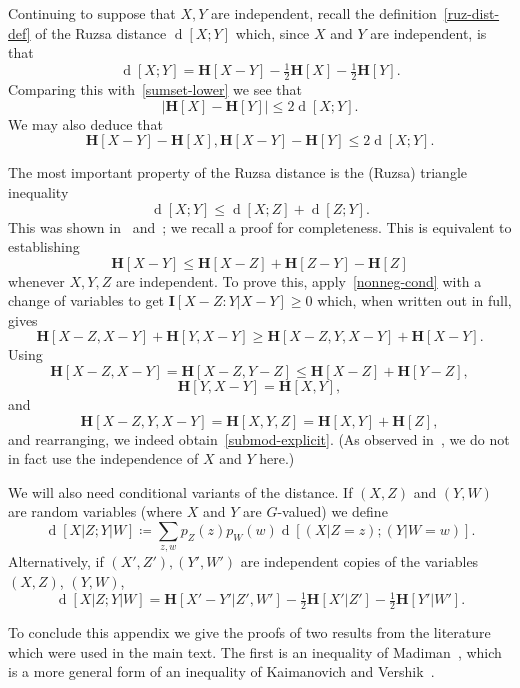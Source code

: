 \documentclass[12pt,reqno,tbtags]{amsart}
\theoremstyle{definition}
\theoremstyle{remark}
\renewcommand{\leq}{\leqslant}
\renewcommand{\geq}{\geqslant}
\newcommand{\ent}[1]{\mathbf{H}[#1]}
\newcommand{\I}[1]{\mathbf{I}[#1]}
\newcommand{\dist}[2]{{\operatorname{d}[#1;#2]}} %
\numberwithin{equation}{section}
\begin{document}
Continuing to suppose that $X, Y$ are independent, recall the definition~\eqref{ruz-dist-def} of the Ruzsa distance $\dist{X}{Y}$ which, since $X$ and $Y$ are independent, is that
\[
  \dist{X}{Y} = \ent{X - Y} - \tfrac{1}{2} \ent{X} - \tfrac{1}{2} \ent{Y}.
\]
Comparing this with~\eqref{sumset-lower} we see that
\begin{equation}
  \label{ruzsa-diff}
  |\ent{X}-\ent{Y}| \leq 2\dist{X}{Y}.
\end{equation}
We may also deduce that
\[
  \ent{X-Y} - \ent{X}, \ent{X-Y} - \ent{Y} \leq 2\dist{X}{Y}.
\]

The most important property of the Ruzsa distance is the (Ruzsa) triangle inequality
\[ \dist{X}{Y} \leq \dist{X}{Z} + \dist{Z}{Y}.\]
This was shown in~\cite{ruzsa-entropy} and~\cite[(16)]{tao-entropy}; we recall a proof for completeness.
This is equivalent to establishing
\begin{equation}\label{submod-explicit} \ent{X - Y} \leq \ent{X-Z} + \ent{Z-Y} - \ent{Z}\end{equation}
whenever $X, Y, Z$ are independent. To prove this, apply~\eqref{nonneg-cond} with a change of variables to get $\I{X-Z : Y | X - Y} \geq 0$ which, when written out in full, gives
\[ \ent{X - Z, X - Y} + \ent{Y, X - Y} \geq \ent{X - Z, Y, X - Y} + \ent{X - Y}.\]
Using
\[ \ent{X - Z, X - Y} = \ent{X-Z, Y-Z}  \leq \ent{X - Z} + \ent{Y - Z},\]
\[ \ent{Y, X - Y} = \ent{X, Y}, \] and
\[ \ent{X - Z, Y, X - Y} = \ent{X, Y, Z} = \ent{X, Y} + \ent{Z},\] and rearranging, we indeed obtain~\eqref{submod-explicit}. (As observed in~\cite{gmt}, we do not in fact use the independence of $X$ and $Y$ here.)


We will also need conditional variants of the distance.
If $(X, Z)$ and $(Y, W)$ are random variables (where $X$ and $Y$ are $G$-valued) we define
\begin{equation} \dist{X  | Z}{Y | W}   \coloneqq \sum_{z,w} p_{Z}(z) p_{W}(w) \dist{(X| Z=z)}{(Y| W = w )}.\label{cond-dist-def}
\end{equation}
Alternatively, if $(X',Z'), (Y',W')$ are independent copies of the variables $(X,Z)$, $(Y,W)$,
\begin{equation}\label{cond-dist-alt} \dist{X  | Z}{Y | W} = \ent{X'-Y'|Z',W'} - \tfrac{1}{2} \ent{X'|Z'} - \tfrac{1}{2}\ent{Y'|W'} .\end{equation}

To conclude this appendix we give the proofs of two results from the literature which were used in the main text.  The first is an inequality of Madiman~\cite[Theorem I]{madiman}, which is a more general form of an inequality of Kaimanovich and Vershik~\cite[Proposition 1.3]{kv}.
\end{document}
